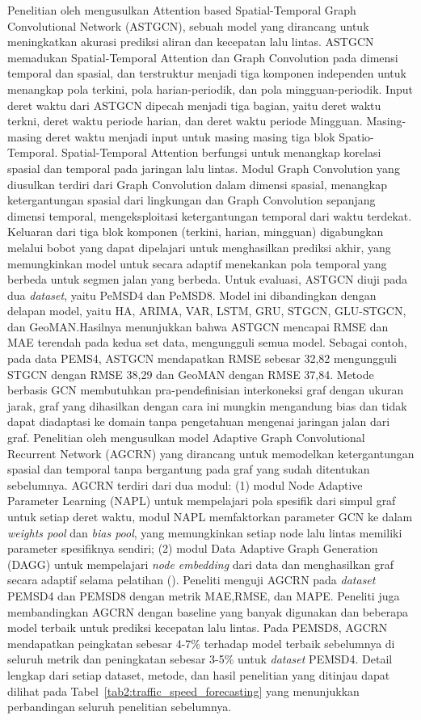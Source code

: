 Penelitian oleh \cite{Guo2019} mengusulkan Attention based Spatial-Temporal Graph Convolutional Network (ASTGCN), sebuah model yang dirancang untuk meningkatkan akurasi prediksi aliran dan kecepatan lalu lintas. ASTGCN memadukan Spatial-Temporal Attention dan Graph Convolution pada dimensi temporal dan spasial, dan terstruktur menjadi tiga komponen independen untuk menangkap pola terkini, pola harian-periodik, dan pola mingguan-periodik. Input deret waktu dari ASTGCN dipecah menjadi tiga bagian, yaitu deret waktu terkni, deret waktu periode harian, dan deret waktu periode Mingguan. Masing-masing deret waktu menjadi input untuk masing masing tiga blok Spatio-Temporal. Spatial-Temporal Attention berfungsi untuk menangkap korelasi spasial dan temporal pada jaringan lalu lintas. Modul Graph Convolution yang diusulkan terdiri dari Graph Convolution dalam dimensi spasial, menangkap ketergantungan spasial dari lingkungan dan Graph Convolution sepanjang dimensi temporal, mengeksploitasi ketergantungan temporal dari waktu terdekat. Keluaran dari tiga blok komponen (terkini, harian, mingguan) digabungkan melalui bobot yang dapat dipelajari untuk menghasilkan prediksi akhir, yang memungkinkan model untuk secara adaptif menekankan pola temporal yang berbeda untuk segmen jalan yang berbeda. Untuk evaluasi, ASTGCN diuji pada dua \textit{dataset}, yaitu PeMSD4 dan PeMSD8. Model ini dibandingkan dengan delapan model, yaitu HA, ARIMA, VAR, LSTM, GRU, STGCN, GLU-STGCN, dan GeoMAN.Hasilnya menunjukkan bahwa ASTGCN mencapai RMSE dan MAE terendah pada kedua set data, mengungguli semua model. Sebagai contoh, pada data PEMS4, ASTGCN mendapatkan RMSE sebesar 32,82 mengungguli STGCN dengan RMSE 38,29 dan GeoMAN dengan RMSE 37,84. Metode berbasis GCN membutuhkan pra-pendefinisian interkoneksi graf dengan ukuran jarak, graf yang dihasilkan dengan cara ini mungkin mengandung bias dan tidak dapat diadaptasi ke domain tanpa pengetahuan mengenai jaringan jalan dari graf. Penelitian oleh \cite{Bai2020} mengusulkan model Adaptive Graph Convolutional Recurrent Network (AGCRN) yang dirancang untuk memodelkan ketergantungan spasial dan temporal tanpa bergantung pada graf yang sudah ditentukan sebelumnya. AGCRN terdiri dari dua modul: (1) modul Node Adaptive Parameter Learning (NAPL) untuk mempelajari pola spesifik dari simpul graf untuk setiap deret waktu, modul NAPL memfaktorkan parameter GCN ke dalam \textit{weights pool} dan \textit{bias pool}, yang memungkinkan setiap node lalu lintas memiliki parameter spesifiknya sendiri; (2) modul Data Adaptive Graph Generation (DAGG) untuk mempelajari \textit{node embedding } dari data dan menghasilkan graf secara adaptif selama pelatihan (\cite{Bai2020}). Peneliti menguji AGCRN pada \textit{dataset} PEMSD4 dan PEMSD8 dengan metrik MAE,RMSE, dan MAPE. Peneliti juga membandingkan AGCRN dengan baseline yang banyak digunakan dan beberapa model terbaik untuk prediksi kecepatan lalu lintas. Pada PEMSD8, AGCRN mendapatkan peingkatan sebesar 4-7\% terhadap model terbaik sebelumnya di seluruh metrik dan peningkatan sebesar 3-5\% untuk \textit{dataset} PEMSD4. Detail lengkap dari setiap dataset, metode, dan hasil penelitian yang ditinjau dapat dilihat pada Tabel~\ref{tab2:traffic_speed_forecasting} yang menunjukkan perbandingan seluruh penelitian sebelumnya.

